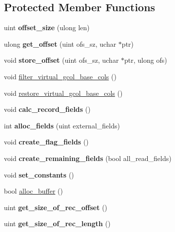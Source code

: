 \subsection*{Protected Member Functions}
\begin{DoxyCompactItemize}
\item 
\mbox{\label{classJOIN__CACHE_a5d66a160fcb173db3e0b24a2677e6e3b}} 
uint {\bfseries offset\+\_\+size} (ulong len)
\item 
\mbox{\label{classJOIN__CACHE_a9ce4409ededfdada4ad55a713bd39d47}} 
ulong {\bfseries get\+\_\+offset} (uint ofs\+\_\+sz, uchar $\ast$ptr)
\item 
\mbox{\label{classJOIN__CACHE_a8ea7507e9c4972cd118b4f0691353a92}} 
void {\bfseries store\+\_\+offset} (uint ofs\+\_\+sz, uchar $\ast$ptr, ulong ofs)
\item 
void \mbox{\hyperlink{group__Query__Optimizer_gaae89dde6a1925032ade263c27a87529f}{filter\+\_\+virtual\+\_\+gcol\+\_\+base\+\_\+cols}} ()
\item 
void \mbox{\hyperlink{group__Query__Optimizer_gabfdf6220265d56c5dc44081d89abc73e}{restore\+\_\+virtual\+\_\+gcol\+\_\+base\+\_\+cols}} ()
\item 
void {\bfseries calc\+\_\+record\+\_\+fields} ()
\item 
int {\bfseries alloc\+\_\+fields} (uint external\+\_\+fields)
\item 
void {\bfseries create\+\_\+flag\+\_\+fields} ()
\item 
void {\bfseries create\+\_\+remaining\+\_\+fields} (bool all\+\_\+read\+\_\+fields)
\item 
void {\bfseries set\+\_\+constants} ()
\item 
bool \mbox{\hyperlink{group__Query__Optimizer_ga5932344e1185abf63788970856f45766}{alloc\+\_\+buffer}} ()
\item 
\mbox{\label{classJOIN__CACHE_af4c8a0b375f7859893ce2e0127c238c8}} 
uint {\bfseries get\+\_\+size\+\_\+of\+\_\+rec\+\_\+offset} ()
\item 
\mbox{\label{classJOIN__CACHE_a93f05d0fb6a15215ced10352faedcd32}} 
uint {\bfseries get\+\_\+size\+\_\+of\+\_\+rec\+\_\+length} ()
\item 
\mbox{\label{classJOIN__CACHE_a9ce576ba02ae80ee38a4b69c04ea8c96}} 

\end{DoxyCompactItemize}
